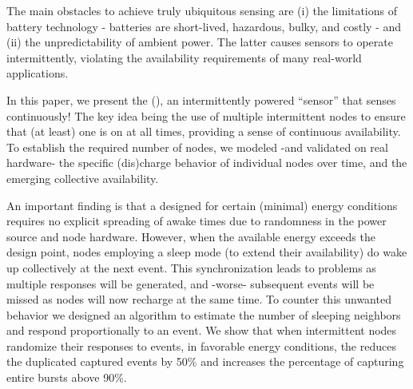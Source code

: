 The main obstacles to achieve truly ubiquitous sensing are (i) the limitations of battery technology - batteries are short-lived, hazardous, bulky, and costly - and (ii) the unpredictability of ambient power. The latter causes sensors to operate intermittently, violating the availability requirements of many real-world applications. 

In this paper, we present the \textit{\fullsys} (\sys), an intermittently powered ``sensor'' that senses continuously! The key idea being the use of multiple intermittent nodes to ensure that (at least) one is on at all times, providing a sense of continuous availability.
To establish the required number of nodes, we modeled -and validated on real hardware- the specific (dis)charge behavior of individual nodes over time, and the emerging collective availability. 

An important finding is that a \sys designed for certain (minimal) energy conditions requires no explicit spreading of awake times due to randomness in the power source and node hardware. However, when the available energy exceeds the design point, nodes employing a sleep mode (to extend their availability) do wake up collectively at the next event. This synchronization leads to problems as multiple responses will be generated, and -worse- subsequent events will be missed as nodes will now recharge at the same time.
To counter this unwanted behavior we designed an algorithm to estimate the number of sleeping neighbors and respond proportionally to an event. 
We show that when intermittent nodes randomize their responses to events, in favorable energy conditions, the \sys reduces the duplicated captured events by 50\% and increases the percentage of capturing entire bursts above 90\%. 
